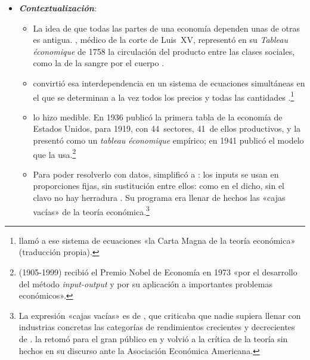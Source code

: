 \documentclass[11pt]{article}
\begin{document}
\begin{itemize}
\item \textbf{\emph{Contextualización}}:
  \begin{itemize}
  \item La idea de que todas las partes de una economía dependen unas de otras es antigua. , médico de la corte de Luis~XV, representó en su \emph{Tableau économique} de 1758 la circulación del producto entre las clases sociales, como la de la sangre por el cuerpo\nocite{Quesnay1758Tableau} .
  \item \textcite{Walras1874Elements} convirtió esa interdependencia en un sistema de ecuaciones simultáneas en el que se determinan a la vez todos los precios y todas las cantidades .\footnote{ llamó a ese sistema de ecuaciones «la Carta Magna de la teoría económica» (traducción propia)\nocite{Schumpeter1954History}.}
  \item {} lo hizo medible. En 1936 publicó la primera tabla de la economía de Estados Unidos, para 1919, con 44~sectores, 41~de ellos productivos, y la presentó como un \emph{tableau économique} empírico\nocite{Leontief1936Quantitative,Kohli2001Leontief}; en 1941 publicó el modelo que la usa\nocite{Leontief1941}.\footnote{ (1905-1999) recibió el Premio Nobel de Economía en 1973 «por el desarrollo del método \emph{input-output} y por su aplicación a importantes problemas económicos»\nocite{Nobel1973Leontief}.}
  \item Para poder resolverlo con datos,  simplificó a : los inputs se usan en proporciones fijas, sin sustitución entre ellos: como en el dicho, sin el clavo no hay herradura . Su programa era llenar de hechos las «cajas vacías» de la teoría económica.\footnote{La expresión «cajas vacías» es de \textcite{Clapham1922Empty}, que criticaba que nadie supiera llenar con industrias concretas las categorías de rendimientos crecientes y decrecientes de .  la retomó para el gran público en \textcite{Leontief1951Input} y volvió a la crítica de la teoría sin hechos en su discurso ante la Asociación Económica Americana\nocite{Leontief1971Theoretical}.}

\end{itemize}
\end{itemize}
\end{document}
